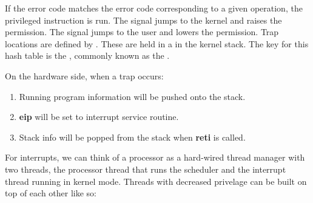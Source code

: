 \documentclass[../../lecture_notes.tex]{subfiles}
\begin{document}
\begin{minipage}{0.2\linewidth}
\end{minipage}%
\begin{minipage}{0.8\linewidth}
If the error code matches the error code corresponding to a given operation, the privileged instruction is run. The  signal jumps to the kernel and raises the permission. The  signal jumps to the user and lowers the permission. Trap locations are defined by . These are held in a  in the kernel stack. The key for this hash table is the , commonly known as the . \smallskip

On the hardware side, when a trap occurs:
\begin{enumerate}[nosep]
\item Running program information will be pushed onto the stack.
\item \textbf{eip} will be set to interrupt service routine.
\item Stack info will be popped from the stack when \textbf{reti} is called.
\end{enumerate}
\end{minipage}

For interrupts, we can think of a processor as a hard-wired thread manager with two threads, the processor thread that runs the scheduler and the interrupt thread running in kernel mode. Threads with decreased privelage can be built on top of each other like so:
\end{document}
